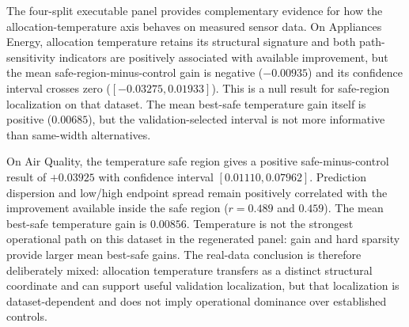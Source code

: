 \documentclass[11pt,a4paper]{article}
\begin{document}
\begin{table}[t]
\centering
\caption{Executable four-split real-world sensor benchmark summary. Appliances Energy yields a null safe-region-versus-control result, whereas Air Quality gives a positive result. Path indicators report the correlation of prediction dispersion and low/high endpoint spread with available best-safe improvement.}
\label{tab:real_world}
\end{table}

The four-split executable panel provides complementary evidence for how the allocation-temperature axis behaves on measured sensor data. On Appliances Energy, allocation temperature retains its structural signature and both path-sensitivity indicators are positively associated with available improvement, but the mean safe-region-minus-control gain is negative ($-0.00935$) and its confidence interval crosses zero ($[-0.03275,0.01933]$). This is a null result for safe-region localization on that dataset. The mean best-safe temperature gain itself is positive ($0.00685$), but the validation-selected interval is not more informative than same-width alternatives.

On Air Quality, the temperature safe region gives a positive safe-minus-control result of $+0.03925$ with confidence interval $[0.01110,0.07962]$. Prediction dispersion and low/high endpoint spread remain positively correlated with the improvement available inside the safe region ($r=0.489$ and $0.459$). The mean best-safe temperature gain is $0.00856$. Temperature is not the strongest operational path on this dataset in the regenerated panel: gain and hard sparsity provide larger mean best-safe gains. The real-data conclusion is therefore deliberately mixed: allocation temperature transfers as a distinct structural coordinate and can support useful validation localization, but that localization is dataset-dependent and does not imply operational dominance over established controls.
\end{document}
